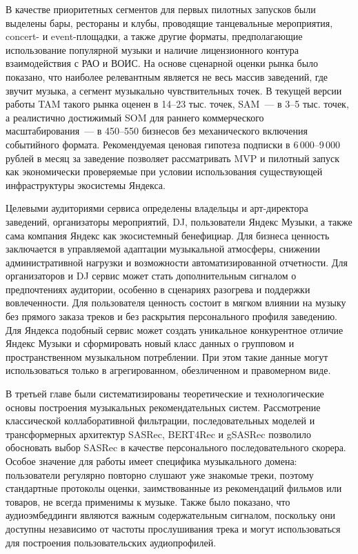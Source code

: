 В качестве приоритетных сегментов для первых пилотных запусков были выделены бары, рестораны и клубы, проводящие танцевальные мероприятия, concert- и event-площадки, а также другие форматы, предполагающие использование популярной музыки и наличие лицензионного контура взаимодействия с РАО и ВОИС. На основе сценарной оценки рынка было показано, что наиболее релевантным является не весь массив заведений, где звучит музыка, а сегмент музыкально чувствительных точек. В текущей версии работы TAM такого рынка оценен в 14--23 тыс. точек, SAM~--- в 3--5 тыс. точек, а реалистично достижимый SOM для раннего коммерческого масштабирования~--- в 450--550 бизнесов без механического включения событийного формата. Рекомендуемая ценовая гипотеза подписки в 6\,000--9\,000 рублей в месяц за заведение позволяет рассматривать MVP и пилотный запуск как экономически проверяемые при условии использования существующей инфраструктуры экосистемы Яндекса.

Целевыми аудиториями сервиса определены владельцы и арт-директора заведений, организаторы мероприятий, DJ, пользователи Яндекс Музыки, а также сама компания Яндекс как экосистемный бенефициар. Для бизнеса ценность заключается в управляемой адаптации музыкальной атмосферы, снижении административной нагрузки и возможности автоматизированной отчетности. Для организаторов и DJ сервис может стать дополнительным сигналом о предпочтениях аудитории, особенно в сценариях разогрева и поддержки вовлеченности. Для пользователя ценность состоит в мягком влиянии на музыку без прямого заказа треков и без раскрытия персонального профиля заведению. Для Яндекса подобный сервис может создать уникальное конкурентное отличие Яндекс Музыки и сформировать новый класс данных о групповом и пространственном музыкальном потреблении. При этом такие данные могут использоваться только в агрегированном, обезличенном и правомерном виде.

В третьей главе были систематизированы теоретические и технологические основы построения музыкальных рекомендательных систем. Рассмотрение классической коллаборативной фильтрации, последовательных моделей и трансформерных архитектур SASRec, BERT4Rec и gSASRec позволило обосновать выбор SASRec в качестве персонального последовательного скорера. Особое значение для работы имеет специфика музыкального домена: пользователи регулярно повторно слушают уже знакомые треки, поэтому стандартные протоколы оценки, заимствованные из рекомендаций фильмов или товаров, не всегда применимы к музыке. Также было показано, что аудиоэмбеддинги являются важным содержательным сигналом, поскольку они доступны независимо от частоты прослушивания трека и могут использоваться для построения пользовательских аудиопрофилей.

